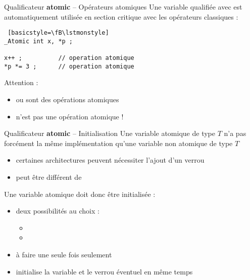 \begin {frame} [fragile] {Qualificateur \textbf {atomic} -- Opérateurs atomiques}
    Une variable qualifiée avec  est automatiquement
    utilisée en section critique avec les opérateurs classiques :

    \begin {lstlisting} [basicstyle=\fB\lstmonstyle]
_Atomic int x, *p ;

x++ ;          // operation atomique
*p *= 3 ;      // operation atomique
\end{lstlisting}

    \vspace* {3mm}

    Attention :
    \begin {itemize}
	\item {}  ou  sont des opérations atomiques
	\item {} n'est pas une opération atomique !
    \end {itemize}

\end{frame}

\begin {frame} {Qualificateur \textbf {atomic} -- Initialisation}
    Une variable atomique de type $T$ n'a pas forcément la même
    implémentation qu'une variable non atomique de type $T$

    \begin {itemize} 
	\item certaines architectures peuvent nécessiter l'ajout
	    d'un verrou

	\item {} peut être différent de

    \end {itemize} 

    Une variable atomique doit donc être initialisée :

    \begin {itemize}
	\item deux possibilités au choix :
	    \begin {itemize}
		\item {}
		\item {}
	    \end {itemize}
	\item à faire une seule fois seulement
	\item initialise la variable et le verrou éventuel en même temps
    \end {itemize}
\end {frame}


